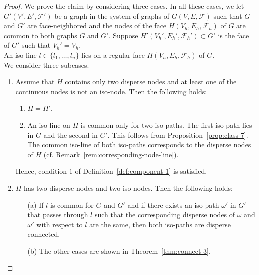 \documentclass[a4paper,11pt]{article}
\begin{document}
\begin{proof}
We prove the claim by considering three cases. In all these cases, we let $G'(V',E',\mathcal{F}')$ be a
graph in the system of graphs of $G(V,E,\mathcal{F})$ such that $G$ and $G'$ are face-neighbored and
the nodes of the face $H(V_h,E_h,\mathcal{F}_h)$ of $G$ are common to both graphs $G$ and $G'$.
Suppose $H'(V_h',E_h',\mathcal{F}_h')\subset G'$ is the face of $G'$ such that $V_h'=V_h$.\\

An iso-line $l\in\{l_1,\ldots,l_n\}$ lies on a regular face $H(V_h,E_h,\mathcal{F}_h)$
of $G$. \\

We consider three subcases.
\begin{enumerate}
\item Assume that $H$ contains only two disperse nodes and at least one of the continuous nodes is not
an iso-node. Then the following holds:
\begin{enumerate}
\item $H=H'$.
\item An iso-line on $H$ is common only for two iso-paths. The first iso-path lies in $G$ and the second in
$G'$. This follows from Proposition~\ref{prop:class-7}. The common iso-line of both iso-paths corresponds to
the disperse nodes of $H$ (cf. Remark~\ref{rem:corresponding-node-line}).
\end{enumerate}
Hence, condition $1$ of Definition~\ref{def:component-1} is satisfied.

\item $H$ has two disperse nodes and two iso-nodes. Then the following holds:
\begin{enumerate}
\item[(a)] If $l$ is common for $G$ and $G'$ and if there exists an iso-path $\omega'$ in $G'$ that passes
through $l$ such that the corresponding disperse nodes of $\omega$ and $\omega'$ with respect to $l$ are
the same, then both iso-paths are disperse connected.

\item[(b)] The other cases are shown in Theorem~\ref{thm:connect-3}.
\end{enumerate}


\end{enumerate}
\end{proof}
\end{document}
